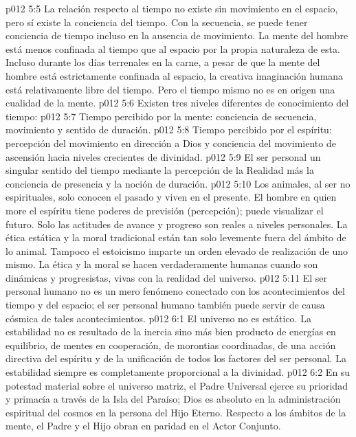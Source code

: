 \vs p012 5:5 \pc La relación respecto al tiempo no existe sin movimiento en el espacio, pero sí existe la conciencia del tiempo. Con la secuencia, se puede tener conciencia de tiempo incluso en la ausencia de movimiento. La mente del hombre está menos confinada al tiempo que al espacio por la propia naturaleza de esta. Incluso durante los días terrenales en la carne, a pesar de que la mente del hombre está estrictamente confinada al espacio, la creativa imaginación humana está relativamente libre del tiempo. Pero el tiempo mismo no es en origen una cualidad de la mente.
\vs p012 5:6 \pc Existen tres niveles diferentes de conocimiento del tiempo:
\vs p012 5:7 Tiempo percibido por la mente: conciencia de secuencia, movimiento y sentido de duración.
\vs p012 5:8 Tiempo percibido por el espíritu: percepción del movimiento en dirección a Dios y conciencia del movimiento de ascensión hacia niveles crecientes de divinidad.
\vs p012 5:9 El ser personal  un singular sentido del tiempo mediante la percepción de la Realidad más la conciencia de presencia y la noción de duración.
\vs p012 5:10 \pc Los animales, al ser no espirituales, solo conocen el pasado y viven en el presente. El hombre en quien more el espíritu tiene poderes de previsión (percepción); puede visualizar el futuro. Solo las actitudes de avance y progreso son reales a niveles personales. La ética estática y la moral tradicional están tan solo levemente fuera del ámbito de lo animal. Tampoco el estoicismo imparte un orden elevado de realización de uno mismo. La ética y la moral se hacen verdaderamente humanas cuando son dinámicas y progresistas, vivas con la realidad del universo.
\vs p012 5:11 El ser personal humano no es un mero fenómeno conectado con los acontecimientos del tiempo y del espacio; el ser personal humano también puede servir de causa cósmica de tales acontecimientos.
\vs p012 6:1 El universo no es estático. La estabilidad no es resultado de la inercia sino más bien producto de energías en equilibrio, de mentes en cooperación, de morontias coordinadas, de una acción directiva del espíritu y de la unificación de todos los factores del ser personal. La estabilidad siempre es completamente proporcional a la divinidad.
\vs p012 6:2 En su potestad material sobre el universo matriz, el Padre Universal ejerce su prioridad y primacía a través de la Isla del Paraíso; Dios es absoluto en la administración espiritual del cosmos en la persona del Hijo Eterno. Respecto a los ámbitos de la mente, el Padre y el Hijo obran en paridad en el Actor Conjunto.
